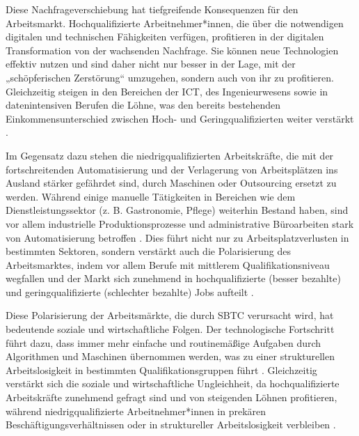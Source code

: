 Diese Nachfrageverschiebung hat tiefgreifende Konsequenzen für den Arbeitsmarkt. 
Hochqualifizierte Arbeitnehmer*innen, die über die notwendigen digitalen und technischen 
Fähigkeiten verfügen, profitieren in der digitalen Transformation von der wachsenden 
Nachfrage. Sie können neue Technologien effektiv nutzen und sind daher nicht nur besser in 
der Lage, mit der „schöpferischen Zerstörung“ 
\parencite[vgl.][S. 81]{schumpeter1976capitalism} umzugehen, 
sondern auch von ihr zu profitieren. Gleichzeitig steigen in den Bereichen der \ac{ICT}, 
des Ingenieurwesens sowie in datenintensiven Berufen die Löhne, was den bereits bestehenden 
Einkommensunterschied zwischen Hoch- und Geringqualifizierten weiter verstärkt 
\parencite[vgl.][S. 2511]{goos2014explaining}.

Im Gegensatz dazu stehen die niedrigqualifizierten Arbeitskräfte, die mit der 
fortschreitenden Automatisierung und der Verlagerung von Arbeitsplätzen ins Ausland stärker 
gefährdet sind, durch Maschinen oder Outsourcing ersetzt zu werden. Während einige manuelle 
Tätigkeiten in Bereichen wie dem Dienstleistungssektor (z. B. Gastronomie, Pflege) 
weiterhin Bestand haben, sind vor allem industrielle Produktionsprozesse und administrative 
Büroarbeiten stark von Automatisierung betroffen \parencite[vgl.][S. 260]{frey2013thefuture}. 
Dies führt nicht nur zu Arbeitsplatzverlusten in bestimmten Sektoren, sondern verstärkt auch 
die Polarisierung des Arbeitsmarktes, indem vor allem Berufe mit mittlerem 
Qualifikationsniveau wegfallen und der Markt sich zunehmend in hochqualifizierte (besser 
bezahlte) und geringqualifizierte (schlechter bezahlte) Jobs aufteilt 
\parencite[vgl.][S. 1283]{autor2003theskill}.

Diese Polarisierung der Arbeitsmärkte, die durch \ac{SBTC} verursacht wird, hat bedeutende 
soziale und wirtschaftliche Folgen. Der technologische Fortschritt führt dazu, dass immer 
mehr einfache und routinemäßige Aufgaben durch Algorithmen und Maschinen übernommen werden, 
was zu einer strukturellen Arbeitslosigkeit in bestimmten Qualifikationsgruppen führt 
\parencite[vgl.][S. 2512]{goos2014explaining}. Gleichzeitig verstärkt sich die soziale und 
wirtschaftliche Ungleichheit, da hochqualifizierte Arbeitskräfte zunehmend gefragt sind und 
von steigenden Löhnen profitieren, während niedrigqualifizierte Arbeitnehmer*innen in 
prekären Beschäftigungsverhältnissen oder in struktureller Arbeitslosigkeit verbleiben 
\parencite[vgl.][S. 12]{arntz2016therisk}.


